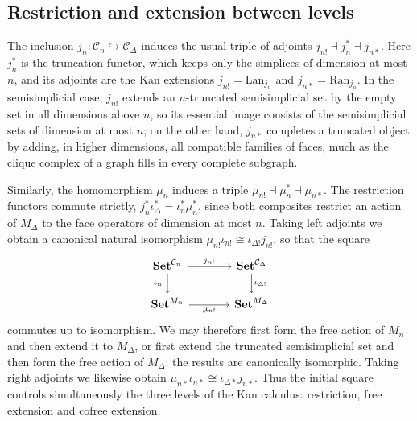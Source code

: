 \documentclass[11pt]{amsart}
\theoremstyle{definition}
\theoremstyle{remark}
\numberwithin{figure}{section}%
\newcommand{\CC}{\mathcal{C}}
\newcommand{\Ran}{\mathrm{Ran}}
\newcommand{\Lan}{\mathrm{Lan}}
\newcommand{\Set}{\mathbf{Set}}
\begin{document}
\subsection{Restriction and extension between levels}
\label{subsec:restriction-between-levels}

The inclusion $j_n\colon\CC_n\hookrightarrow\CC_\Delta$ induces the usual triple of adjoints $j_{n!}\dashv j_n^*\dashv j_{n*}$. Here $j_n^*$ is the truncation functor, which keeps only the simplices of dimension at most $n$, and its adjoints are the Kan extensions $j_{n!}=\Lan_{j_n}$ and $j_{n*}=\Ran_{j_n}$. In the semisimplicial case, $j_{n!}$ extends an $n$-truncated semisimplicial set by the empty set in all dimensions above $n$, so its essential image consists of the semisimplicial sets of dimension at most $n$; on the other hand, $j_{n*}$ completes a truncated object by adding, in higher dimensions, all compatible families of faces, much as the clique complex of a graph fills in every complete subgraph.

Similarly, the homomorphism $\mu_n$ induces a triple $\mu_{n!}\dashv\mu_n^*\dashv\mu_{n*}$. The restriction functors commute strictly, $j_n^*\iota_\Delta^*=\iota_n^*\mu_n^*$, since both composites restrict an action of $M_\Delta$ to the face operators of dimension at most $n$. Taking left adjoints we obtain a canonical natural isomorphism $\mu_{n!}\iota_{n!}\cong\iota_{\Delta!}j_{n!}$, so that the square
\[
\begin{tikzcd}[column sep=large]
\Set^{\CC_n} \ar[r,"j_{n!}"] \ar[d,"\iota_{n!}"'] & \Set^{\CC_\Delta} \ar[d,"\iota_{\Delta!}"]\\
\Set^{M_n} \ar[r,"\mu_{n!}"'] & \Set^{M_\Delta}
\end{tikzcd}
\]
commutes up to isomorphism. We may therefore first form the free action of $M_n$ and then extend it to $M_\Delta$, or first extend the truncated semisimplicial set and then form the free action of $M_\Delta$: the results are canonically isomorphic. Taking right adjoints we likewise obtain $\mu_{n*}\iota_{n*}\cong\iota_{\Delta*}j_{n*}$. Thus the initial square controls simultaneously the three levels of the Kan calculus: restriction, free extension and cofree extension.
\end{document}

